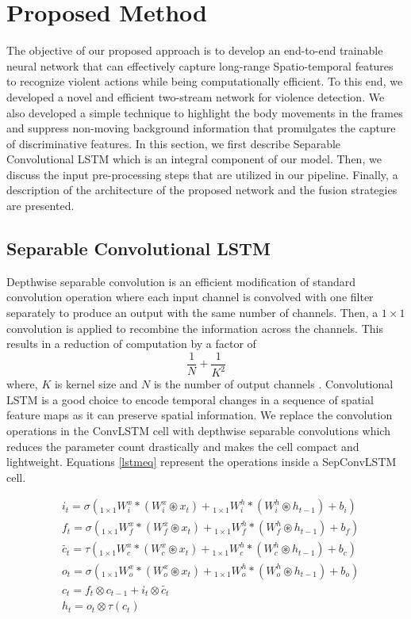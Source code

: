 \documentclass[conference]{IEEEtran}
\begin{document}
\section{Proposed Method}
The objective of our proposed approach is to develop an end-to-end trainable neural network that can effectively capture long-range Spatio-temporal features to recognize violent actions while being computationally efficient. To this end, we developed a novel and efficient two-stream network for violence detection. We also developed a simple technique to highlight the body movements in the frames and suppress non-moving background information that promulgates the capture of discriminative features. In this section, we first describe Separable Convolutional LSTM which is an integral component of our model. Then, we discuss the input pre-processing steps that are utilized in our pipeline. Finally, a description of the architecture of the proposed network and the fusion strategies are presented. 

\subsection{Separable Convolutional LSTM}

Depthwise separable convolution is an efficient modification of standard convolution operation where each input channel is convolved with one filter separately to produce an output with the same number of channels. Then, a \(1 \times 1\) convolution is applied to recombine the information across the channels. This results in a reduction of computation by a factor of \[ \frac{1}{N} + \frac{1}{K^2} \] where, \(K\) is kernel size and \(N\) is the number of output channels \cite{mobilenet}. Convolutional LSTM is a good choice to encode temporal changes in a sequence of spatial feature maps as it can preserve spatial information. We replace the convolution operations in the ConvLSTM cell with depthwise separable convolutions which reduces the parameter count drastically and makes the cell compact and lightweight. Equations \ref{lstmeq} represent the operations inside a SepConvLSTM cell.

\begin{equation}
 \label{lstmeq}
 \begin{split}
    &i_t = \sigma( {}_{1 \times 1}W_i^x * (W_i^x \circledast x_t) + {}_{1 \times 1}W_i^h * (W_i^h \circledast h_{t-1}) + b_i ) \\
    &f_t = \sigma( {}_{1 \times 1}W_f^x * (W_f^x \circledast x_t) + {}_{1 \times 1}W_f^h * (W_f^h \circledast h_{t-1}) + b_f )  \\
    &\tilde{c_t} = \tau ( {}_{1 \times 1}W_c^x * (W_c^x \circledast x_t) + {}_{1 \times 1}W_c^h * (W_c^h \circledast h_{t-1}) + b_c )  \\
    &o_t = \sigma( {}_{1 \times 1}W_o^x * (W_o^x \circledast x_t) + {}_{1 \times 1}W_o^h * (W_o^h \circledast h_{t-1}) + b_o )  \\
    &c_t = f_t \otimes c_{t-1} + i_t \otimes \tilde{c_t} \\
    &h_t = o_t \otimes \tau(c_t)
 \end{split}
\end{equation}
\end{document}
